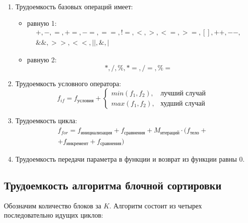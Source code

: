 \begin{enumerate}[label={\arabic*)}]
	\item Трудоемкость базовых операций имеет:
	\begin{itemize}[label=---]
		\item равную 1:
		\begin{equation}
			\label{for:operations_1}
			\begin{gathered}
				+, -, =, +=, -=, ==, !=, <, >, <=, >=, [], ++, {-}-,\\
				\&\&, >>, <<, ||, \&, |
			\end{gathered}
		\end{equation}
		\item равную 2:
		\begin{equation}
			\label{for:operations_2}
			*, /, \%, *=, /=, \%=
		\end{equation}
	\end{itemize}
	\item Трудоемкость условного оператора:
	\begin{equation}
		\label{for:if}
		f_{if} = f_{\text{условия}} + 
		\begin{cases}
			min(f_1, f_2), & \text{лучший случай}\\
			max(f_1, f_2), & \text{худший случай}
		\end{cases}
	\end{equation}
	\item Трудоемкость цикла:
	\begin{equation}
		\label{for:for}
		\begin{gathered}
			f_{for} = f_{\text{инициализация}} + f_{\text{сравнения}} + M_{\text{итераций}} \cdot (f_{\text{тело}} +\\
			+ f_{\text{инкремент}} + f_{\text{сравнения}})
		\end{gathered}
	\end{equation}
	\item Трудоемкость передачи параметра в функции и возврат из функции равны 0.
\end{enumerate}

\clearpage

\subsection{Трудоемкость алгоритма блочной сортировки}

Обозначим количество блоков за $K$. Алгоритм состоит из четырех последовательно идущих циклов:

